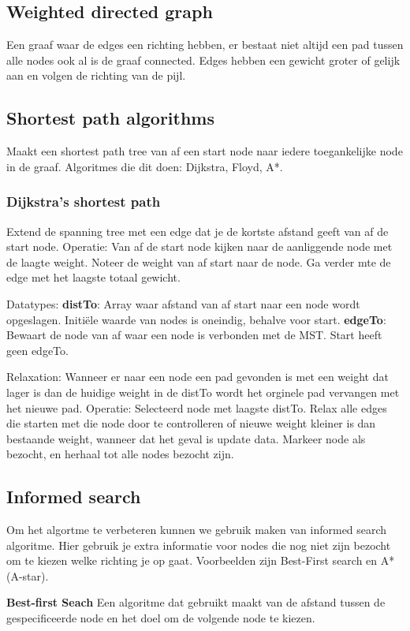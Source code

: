\subsection{Weighted directed graph}
Een graaf waar de edges een richting hebben, er bestaat niet altijd een pad tussen alle nodes ook al is de graaf connected.
Edges hebben een gewicht groter of gelijk aan en volgen de richting van de pijl.

\subsection{Shortest path algorithms}
Maakt een shortest path tree van af een start node naar iedere toegankelijke node in de graaf.
Algoritmes die dit doen: Dijkstra, Floyd, A*.

\subsubsection{Dijkstra's shortest path}
Extend de spanning tree met een edge dat je de kortste afstand geeft van af de start node.
Operatie:
Van af de start node kijken naar de aanliggende node met de laagte weight.
Noteer de weight van af start naar de node.
Ga verder mte de edge met het laagste totaal gewicht.

Datatypes: 
\textbf{distTo}: Array waar afstand van af start naar een node wordt opgeslagen.
Initiële waarde van nodes is oneindig, behalve voor start.
\textbf{edgeTo}: Bewaart de node van af waar een node is verbonden met de MST.
Start heeft geen edgeTo.

Relaxation:
Wanneer er naar een node een pad gevonden is met een weight dat lager is dan de huidige weight in de distTo wordt het orginele pad vervangen met het nieuwe pad.
Operatie:
Selecteerd node met laagste distTo.
Relax alle edges die starten met die node door te controlleren of nieuwe weight kleiner is dan bestaande weight, wanneer dat het geval is update data.
Markeer node als bezocht, en herhaal tot alle nodes bezocht zijn.

\subsection{Informed search}
Om het algortme te verbeteren kunnen we gebruik maken van informed search algoritme.
Hier gebruik je extra informatie voor nodes die nog niet zijn bezocht om te kiezen welke richting je op gaat.
Voorbeelden zijn Best-First search en A* (A-star).

\textbf{Best-first Seach} Een algoritme dat gebruikt maakt van de afstand tussen de gespecificeerde node en het doel om de volgende node te kiezen.


